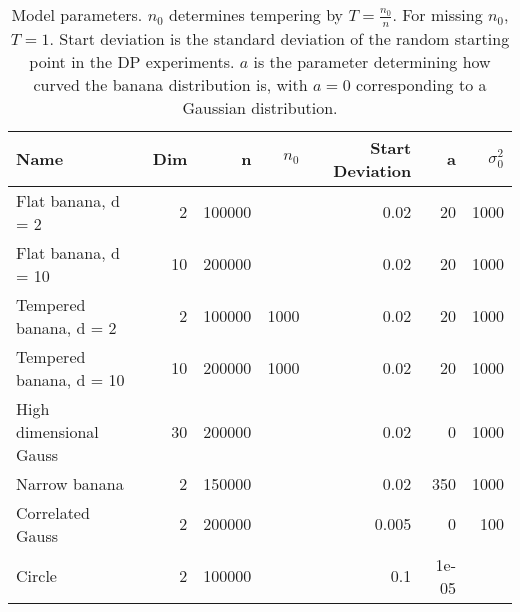 \begin{table}
\centering
\caption{
            Model parameters. $n_0$ determines tempering by \(T=\frac{n_0}{n}\).
            For missing $n_0$, \(T = 1\). Start deviation is the standard deviation
            of the random starting point in the DP experiments. \(a\) is the
            parameter determining how curved the banana distribution is,
            with \(a = 0\) corresponding to a Gaussian distribution.
            }
\label{model_params_table}
\begin{tabular}{lrrrrrr}
\toprule
                    Name &  Dim &       n &  $n_0$ &  Start Deviation &     a &  $\sigma^2_0$ \\
\midrule
      Flat banana, d = 2 &    2 &  100000 &        &             0.02 &    20 &          1000 \\
     Flat banana, d = 10 &   10 &  200000 &        &             0.02 &    20 &          1000 \\
  Tempered banana, d = 2 &    2 &  100000 &   1000 &             0.02 &    20 &          1000 \\
 Tempered banana, d = 10 &   10 &  200000 &   1000 &             0.02 &    20 &          1000 \\
  High dimensional Gauss &   30 &  200000 &        &             0.02 &     0 &          1000 \\
           Narrow banana &    2 &  150000 &        &             0.02 &   350 &          1000 \\
        Correlated Gauss &    2 &  200000 &        &            0.005 &     0 &           100 \\
                  Circle &    2 &  100000 &        &              0.1 & 1e-05 &               \\
\bottomrule
\end{tabular}
\end{table}
